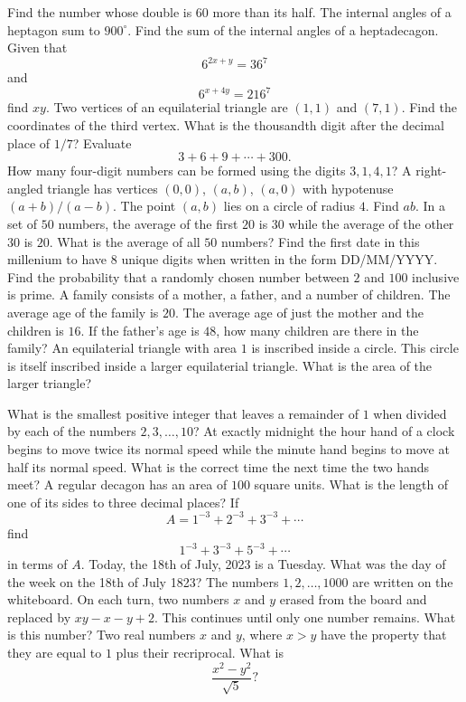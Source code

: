\documentclass[a4paper,12pt]{exam}
\begin{document}
\begin{questions}
  \question Find the number whose double is \(60\) more than its half.
  \question The internal angles of a heptagon sum to \(900^\circ\). Find
  the sum of the internal angles of a heptadecagon.
  \question Given that \[6^{2x+y}=36^7\] and \[6^{x+4y}=216^7\] find \(xy\).
  \question Two vertices of an equilaterial triangle are \((1,1)\)
  and \((7,1)\). Find the coordinates of the third vertex.
  \question What is the thousandth digit after the decimal
  place of \(1/7\)?
  \question Evaluate \[3+6+9+\cdots+300.\]
  \question How many four-digit numbers can be formed using the digits \(3,1,4,1\)?
  \question A right-angled triangle has vertices \((0,0)\), \((a,b)\),
  \((a,0)\) with hypotenuse \((a+b)/(a-b)\). The point \((a,b)\) lies
  on a circle of radius \(4\). Find \(ab\).
  \question In a set of \(50\) numbers, the average of the first \(20\) is \(30\) while
  the average of the other \(30\) is \(20\). What is the average of all \(50\) numbers?
  \question Find the first date in this millenium to have \(8\) unique
  digits when written in the form DD/MM/YYYY.
  \question Find the probability that a randomly chosen number between
  \(2\) and \(100\) inclusive is prime.
  \question A family consists of a mother, a father, and a number of children. The average
  age of the family is \(20\). The average age of just the mother and the children is \(16\).
  If the father's age is \(48\), how many children are there in the family?
  \question An equilaterial triangle with area \(1\) is inscribed inside a circle.
  This circle is itself inscribed inside a larger equilaterial triangle. What is the area
  of the larger triangle?

  \question What is the smallest positive integer that leaves a remainder of \(1\)
  when divided by each of the numbers \(2,3,\ldots,10\)?
  \question At exactly midnight the hour hand of a clock begins to move twice its normal speed
  while the minute hand begins to move at half its normal speed. What is the correct time the next
  time the two hands meet?
  \question A regular decagon has an area of \(100\) square units.
  What is the length of one of its sides to three decimal places?
  \question If \[A=1^{-3}+2^{-3}+3^{-3}+\cdots\] find \[1^{-3}+3^{-3}+5^{-3}+\cdots\] in terms of \(A\).
  \question Today, the 18th of July, 2023 is a Tuesday. What was the day of the week on the 18th of July 1823?
  \question The numbers \(1,2,\ldots,1000\) are written on the whiteboard. On each turn, two numbers \(x\)
  and \(y\) erased from the board and replaced by \(xy-x-y+2\). This continues until only one number remains. What is this number?
  \question Two real  numbers \(x\) and \(y\), where \(x>y\) have the property that they are equal to \(1\) plus their recriprocal. What is \[\frac{x^2-y^2}{\sqrt5}?\]
\end{questions}
\end{document}

